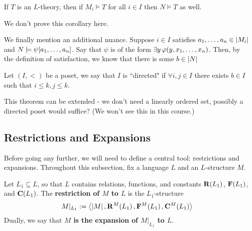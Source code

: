 \begin{boxcorollary}
    If $T$ is an $L$-theory, then if $M_i \models T$ for all $i \in I$ then $N \models T$ as well.
\end{boxcorollary}

We don't prove this corollary here.

We finally mention an additional nuance. Suppose $i \in I$ satisfies $a_1, \ldots, a_n \in \left\lvert M_i \right\rvert$ and $N \models \psi\!\left[ a_1, \ldots, a_n \right]$. Say that $\psi$ is of the form $\exists y \, \varphi\!\left( y, x_1, \ldots, x_n \right)$. Then, by the definition of satisfaction, we know that there is some $b \in \left\lvert N \right\rvert$

\begin{boxdefinition}
    Let $(I, <)$ be a poset, we say that $I$ is ``directed" if $\forall i, j\in I$ there exists $b\in I$ such that $i\leq k, j\leq k$.
\end{boxdefinition}
\begin{remark}
    This theorem can be extended - we don't need a linearly ordered set, possibly a directed poset would suffice? (We won't see this in this course.)
\end{remark}


\subsection{Restrictions and Expansions} %

Before going any further, we will need to define a central tool: restrictions and expansions. Throughout this subsection, fix a language $L$ and an $L$-structure $M$.

\begin{boxdefinition}\label{Ch1:Def:Res_Exp}
    Let $L_1 \subseteq L$, so that $L$ contains relations, functions, and constants $\mathbf{R}\!\left( L_1 \right)$, $\mathbf{F}\!\left( L_1 \right)$, and $\mathbf{C}\!\left( L_1 \right)$. The \textbf{restriction of $M$ to $L$} is the $L_1$-structure
    \begin{align*}
        M \vert_{L_1} := \left\langle \left\lvert M \right\rvert, \mathbf{R}^{M}\!\left( L_1 \right), \mathbf{F}^M\!\left( L_1 \right), \mathbf{C}^M\!\left( L_1 \right) \right\rangle
    \end{align*}
    Dually, we say that \textbf{$M$ is the expansion of $M\vert_{L_1}$ to $L$}.
\end{boxdefinition}


